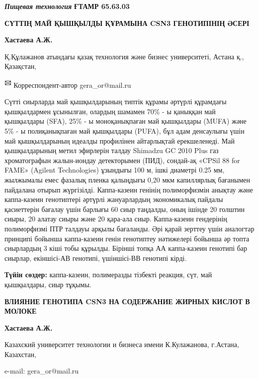 \emph{{\bfseries Пищевая технология}}
\newpage
{\bfseries ҒТАМР 65.63.03}

{\bfseries СҮТТІҢ МАЙ ҚЫШҚЫЛДЫ ҚҰРАМЫНА CSN3 ГЕНОТИПІНІҢ ӘСЕРІ}

{\bfseries Хастаева А.Ж.}

Қ.Құлажанов атындағы қазақ технология және бизнес университеті, Астана
қ., Қазақстан,

{\bfseries \textsuperscript{🖂}} Корреспондент-автор gera\_or@mail.ru

Сүтті сиырларда май қышқылдарының типтік құрамы әртүрлі құрамдағы
қышқылдармен ұсынылған, олардың шамамен 70\% - ы қаныққан май қышқылдары
(SFA), 25\% - ы моноқанықпаған май қышқылдары (MUFA) және 5\% - ы
полиқанықпаған май қышқылдары (PUFA), бұл адам денсаулығы үшін май
қышқылдарының идеалды профилінен айтарлықтай ерекшеленеді. Май
қышқылдарының метил эфирлерін талдау Shimadzu GC 2010 Plus газ
хроматографын жалын-иондау детекторымен (ПИД), сондай-ақ «CPSil 88 for
FAME» (Agilent Technologies) ұзындығы 100 м, ішкі диаметрі 0.25 мм,
жылжымалы емес фазалық пленка қалыңдығы 0,20 мкм капиллярлық бағанымен
пайдалана отырып жүргізілді. Каппа-казеин генінің полиморфизмін анықтау
және каппа-казеин генотиптері әртүрлі жануарлардың экономикалық пайдалы
қасиеттерін бағалау үшін барлығы 60 сиыр таңдалды, оның ішінде 20
голштин сиыры, 20 алатау сиыры және 20 қара-ала сиыр. Каппа-казеин
гендерінің полиморфизмі ПТР талдауы арқылы бағаланды. Әрі қарай зерттеу
үшін аналогтар принципі бойынша каппа-казеин генін генотиптеу нәтижелері
бойынша әр топта сиырлардың 3 кіші тобы құрылды. Бірінші топқа АА
каппа-казеин генотипі бар сиырлар, екіншісі-АВ генотипі, үшіншісі-ВВ
генотипі кірді.

{\bfseries Түйін сөздер:} каппа-казеин, полимеразды тізбекті реакция, сүт,
май қышқылдары, сиыр тұқымы.

{\bfseries ВЛИЯНИЕ ГЕНОТИПА CSN3 НА СОДЕРЖАНИЕ ЖИРНЫХ КИСЛОТ В МОЛОКЕ}

{\bfseries Хастаева А.Ж.}

Казахский университет технологии и бизнеса имени К.Кулажанова, г.Астана,
Казахстан,

e-mail: gera\_or@mail.ru

